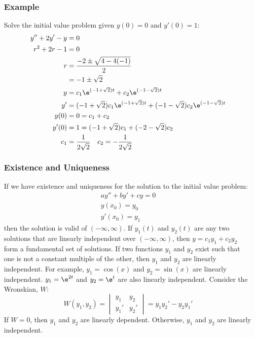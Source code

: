 \documentclass{math}
\begin{document}
\subsubsection*{Example}
Solve the initial value problem given \( y(0) = 0 \) and \( y'(0) = 1 \):
\begin{align*}
  y''+2y'-y &= 0 \\
  r^2+2r-1 &= 0 \\
  r &= \frac{-2\pm\sqrt{4-4(-1)}}{2} \\
  &= -1\pm\sqrt{2} \\
  y &= c_1\e^{(-1+\sqrt{2})t}+c_2\e^{(-1-\sqrt{2})t} \\
  y' &= (-1+\sqrt{2})c_1\e^{(-1+\sqrt{2})t}+
    (-1-\sqrt{2})c_2\e^{(-1-\sqrt{2})t} \\
  y(0) &= 0 = c_1+c_2 \\
  y'(0) &= 1 = (-1+\sqrt{2})c_1+(-2-\sqrt{2})c_2 \\
  c_1 &= \frac{1}{2\sqrt{2}} \quad c_2 = -\frac{1}{2\sqrt{2}}
\end{align*}

\subsubsection*{Existence and Uniqueness}
If we have existence and uniqueness for the solution to the initial value
problem:
\begin{gather*}
  ay''+by'+cy = 0 \\
  y(x_0) = y_0 \\
  y'(x_0) = y_1
\end{gather*}
then the solution is valid of \( (-\infty,\infty) \). If \( y_1(t) \) and
\( y_2(t) \) are any two solutions that are linearly independent over
\( (-\infty,\infty) \), then \( y = c_1y_1+c_2y_2 \) form a fundamental set of
solutions. If two functions \( y_1 \) and \( y_2 \) exist such that one is not
a constant multiple of the other, then \( y_1 \) and \( y_2 \) are linearly
independent. For example, \( y_1 = \cos(x) \) and \( y_2 = \sin(x) \) are
linearly independent. \( y_1 = \e^{2t} \) and \( y_2 = \e^t \) are also
linearly independent. Consider the Wronskian, \( W \):
\[ W(y_1,y_2) = \begin{vmatrix}
  y_1 & y_2 \\
  y_1' & y_2'
\end{vmatrix} = y_1y_2'-y_2y_1' \]
If \( W = 0 \), then \( y_1 \) and \( y_2 \) are linearly dependent. Otherwise,
\( y_1 \) and \( y_2 \) are linearly independent.
\end{document}
